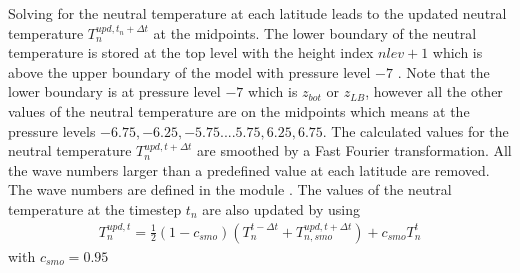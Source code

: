 %
Solving for the neutral temperature at each latitude leads to the
updated neutral temperature $T_n^{upd, t_n+\Delta t}$ at the
midpoints. The lower boundary of the neutral temperature is stored
at the top level with the height index $nlev + 1$ which is above the
upper boundary of the model with pressure level $-7$ . Note that the
lower boundary is at pressure level $-7$ which is $z_{bot}$ or
$z_{LB}$, however all the other values of the neutral temperature
are on the midpoints which means at the pressure levels $ -6.75,
-6.25, -5.75 ....5.75, 6.25, 6.75$. The calculated values for the
neutral temperature $T_n^{upd, t + \Delta t}$ are smoothed by a Fast
Fourier transformation. All the wave numbers larger than a
predefined value at each latitude are removed. The wave numbers are
defined in the module . The values of the neutral
temperature at the timestep $t_n$ are also updated by using
%
\begin{align}
  T_n^{upd,t} = \frac{1}{2}({1-c_{smo}})(T_n^{t-\Delta t}+
     T_{n,smo}^{upd,t+\Delta t}) + c_{smo}T_n^t
\end{align}
%
with $c_{smo} = 0.95$
